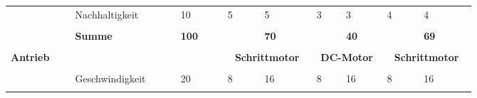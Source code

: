 \documentclass[main.tex]{subfiles} %
\begin{document}
\begin{landscape}
\begin{table}[ht]
\begin{tabular}{|p{0.11\linewidth}|p{0.18\linewidth}|p{0.085\linewidth}|p{0.057\linewidth}|p{0.07\linewidth}|p{0.057\linewidth}|p{0.07\linewidth}|p{0.057\linewidth}|p{0.07\linewidth}|}
                                                      & Nachhaltigkeit                      & 10                                         & 5                                         & 5                                          & 3          & 3           & 4          & 4           \\[1pt]
            \cline{2-9}
                                                      &                                     &                                            &                                           &                                            &            &             &            &             \\[-9pt]
                                                      & \textbf{Summe}                      & \textbf{100}                               &                                           & \textbf{70}                                &            & \textbf{40} &            & \textbf{69} \\[1pt]
            \hline
            \hline
                                                      & \multicolumn{2}{c|}{}               & \multicolumn{2}{c|}{}                      & \multicolumn{2}{c|}{}                     & \multicolumn{2}{c|}{}                                                                            \\[-9pt]
            \multirow{6}{4em}{\textbf{Antrieb}}       & \multicolumn{2}{c|}{}               & \multicolumn{2}{c|}{\textbf{Schrittmotor}} & \multicolumn{2}{c|}{\textbf{DC-Motor}}    & \multicolumn{2}{c|}{\textbf{Schrittmotor}}                                                       \\[1pt]
            \cline{2-9}
                                                      &                                     &                                            &                                           &                                            &            &             &            &             \\[-9pt]
                                                      & Geschwindigkeit                     & 20                                         & 8                                         & 16                                         & 8          & 16          & 8          & 16          \\[1pt]
            \cline{2-9}
                                                      &                                     &                                            &                                           &                                            &            &             &            &             \\[-9pt]

\end{tabular}
\end{table}
\end{landscape}
\end{document}
